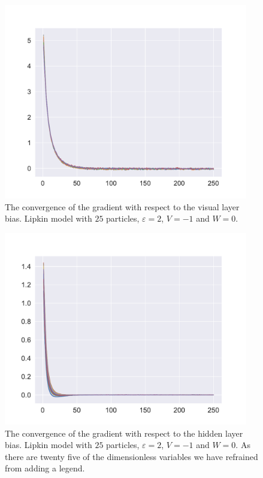 \begin{figure}[H]
  \begin{center}
    \includegraphics[width=0.95\textwidth]{Figures/Plots/Lipkin/Result25dvb}
  \end{center}
  \caption{The convergence of the gradient with respect to the visual layer bias. Lipkin model with $25$ particles, $\varepsilon = 2$, $V = -1$ and $W=0$.}
\end{figure}

\begin{figure}[H]
  \begin{center}
    \includegraphics[width=0.95\textwidth]{Figures/Plots/Lipkin/Result25dhb}
  \end{center}
  \caption{The convergence of the gradient with respect to the hidden layer bias. Lipkin model with $25$ particles, $\varepsilon = 2$, $V = -1$ and $W=0$. As there are twenty five of the dimensionless variables we have refrained from adding a legend.}
\end{figure}


